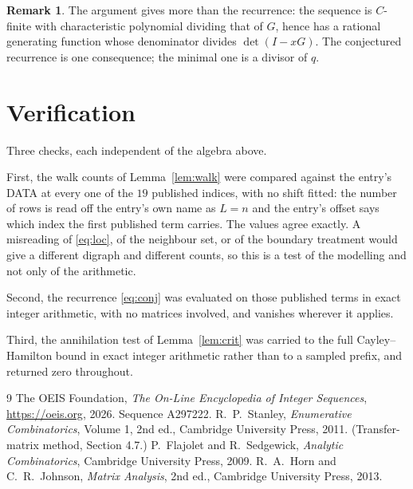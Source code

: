 \documentclass[11pt,a4paper]{article}
\theoremstyle{plain}
\theoremstyle{definition}
\newtheorem{remark}[theorem]{Remark}
\begin{document}
\begin{remark}
The argument gives more than the recurrence: the sequence is $C$-finite with characteristic
polynomial dividing that of $G$, hence has a rational generating function whose denominator
divides $\det(I-xG)$. The conjectured recurrence is one consequence; the minimal one is a
divisor of $q$.
\end{remark}

\section{Verification}

Three checks, each independent of the algebra above.

First, the walk counts of Lemma~\ref{lem:walk} were compared against the entry's DATA at
every one of the $19$ published indices, with no shift fitted: the number of rows is
read off the entry's own name as $L=n$ and the entry's offset says which index the first
published term carries. The values agree exactly. A misreading of \eqref{eq:loc}, of the
neighbour set, or of the boundary treatment would give a different digraph and different
counts, so this is a test of the modelling and not only of the arithmetic.

Second, the recurrence \eqref{eq:conj} was evaluated on those published terms in exact
integer arithmetic, with no matrices involved, and vanishes wherever it applies.

Third, the annihilation test of Lemma~\ref{lem:crit} was carried to the full
Cayley--Hamilton bound in exact integer arithmetic rather than to a sampled prefix, and
returned zero throughout.

\begin{thebibliography}{9}
 The OEIS Foundation, \emph{The On-Line Encyclopedia of Integer
Sequences}, \url{https://oeis.org}, 2026. Sequence A297222.
 R.~P.~Stanley, \emph{Enumerative Combinatorics}, Volume 1, 2nd ed.,
Cambridge University Press, 2011. (Transfer-matrix method, Section 4.7.)
 P.~Flajolet and R.~Sedgewick, \emph{Analytic Combinatorics}, Cambridge
University Press, 2009.
 R.~A.~Horn and C.~R.~Johnson, \emph{Matrix Analysis}, 2nd ed., Cambridge
University Press, 2013.
\end{thebibliography}
\end{document}
